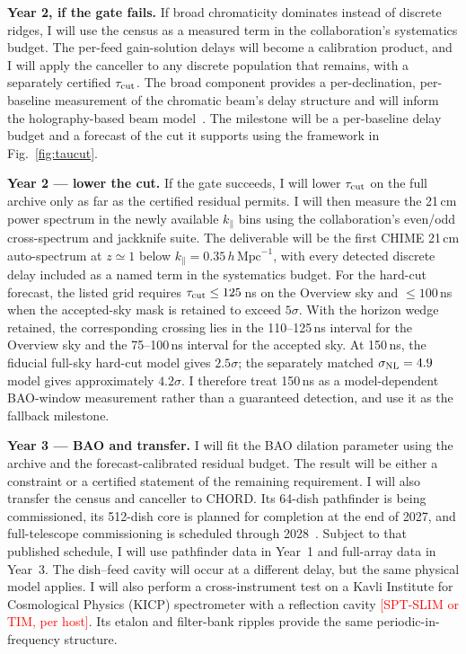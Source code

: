 \documentclass[12pt]{article}
\newcommand{\todo}[1]{\textcolor{red}{[#1]}}
\newcommand{\hMpc}{\,h\,\mathrm{Mpc}^{-1}}
\newcommand{\kpar}{k_\parallel}
\begin{document}
\textbf{Year 2, if the gate fails.} If broad chromaticity dominates instead of discrete ridges, I will use the census as a measured term in the collaboration's systematics budget. The per-feed gain-solution delays will become a calibration product, and I will apply the canceller to any discrete population that remains, with a separately certified $\tau_{\rm cut}$. The broad component provides a per-declination, per-baseline measurement of the chromatic beam's delay structure and will inform the holography-based beam model~\cite[Sec.~VI.3; Eqs.~(16)--(17); Figs.~16--17; Sec.~VII]{chime2024holo}. The milestone will be a per-baseline delay budget and a forecast of the cut it supports using the framework in Fig.~\ref{fig:taucut}.

\textbf{Year 2 --- lower the cut.} If the gate succeeds, I will lower $\tau_{\rm cut}$ on the full archive only as far as the certified residual permits. I will then measure the 21\,cm power spectrum in the newly available $\kpar$ bins using the collaboration's even/odd cross-spectrum and jackknife suite. The deliverable will be the first CHIME 21\,cm auto-spectrum at $z\simeq1$ below $\kpar=0.35\hMpc$, with every detected discrete delay included as a named term in the systematics budget. For the hard-cut forecast, the listed grid requires $\tau_{\rm cut}\le125$\,ns on the Overview sky and $\le100$\,ns when the accepted-sky mask is retained to exceed $5\sigma$. With the horizon wedge retained, the corresponding crossing lies in the 110--125\,ns interval for the Overview sky and the 75--100\,ns interval for the accepted sky. At 150\,ns, the fiducial full-sky hard-cut model gives $2.5\sigma$; the separately matched $\sigma_{\rm NL}=4.9$ model gives approximately $4.2\sigma$. I therefore treat 150\,ns as a model-dependent BAO-window measurement rather than a guaranteed detection, and use it as the fallback milestone.

\textbf{Year 3 --- BAO and transfer.} I will fit the BAO dilation parameter using the archive and the forecast-calibrated residual budget. The result will be either a constraint or a certified statement of the remaining requirement. I will also transfer the census and canceller to CHORD. Its 64-dish pathfinder is being commissioned, its 512-dish core is planned for completion at the end of 2027, and full-telescope commissioning is scheduled through 2028~\cite[Abstract, p.~2; Sec.~11, p.~18; Fig.~9, p.~19]{chord2026}. Subject to that published schedule, I will use pathfinder data in Year~1 and full-array data in Year~3. The dish--feed cavity will occur at a different delay, but the same physical model applies. I will also perform a cross-instrument test on a Kavli Institute for Cosmological Physics (KICP) spectrometer with a reflection cavity \todo{SPT-SLIM or TIM, per host}. Its etalon and filter-bank ripples provide the same periodic-in-frequency structure.
\end{document}

